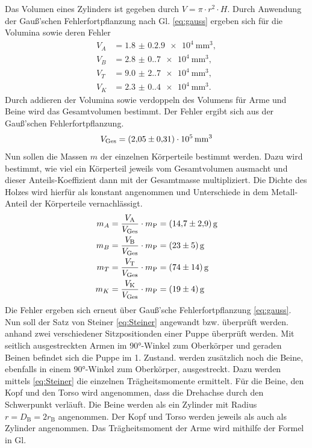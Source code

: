 Das Volumen eines Zylinders ist gegeben durch $V=\pi\cdot r^2\cdot H$. Durch Anwendung der Gauß'schen Fehlerfortpflanzung nach Gl. \eqref{eq:gauss}
ergeben sich für die Volumina sowie deren Fehler 
\begin{align*}
  V_A&=\SI{1.8(0.29)e4}{\milli\meter\cubed},\\
  V_B&=\SI{2.8(0.7)e4} {\milli\meter\cubed},\\
  V_T&=\SI{9.0(2.7)e4} {\milli\meter\cubed},\\
  V_K&=\SI{2.3(0.4)e4} {\milli\meter\cubed}.
\end{align*}
Durch addieren der Volumina sowie verdoppeln des Volumens für Arme und Beine 
wird das Gesamtvolumen bestimmt. Der Fehler ergibt sich aus der Gauß'schen Fehlerfortpflanzung.
\begin{equation*}
  V_\text{Ges}=\qty{2,05+-0,31e5}{\milli\meter\cubed}
\end{equation*}
Nun sollen die Massen $m$ der einzelnen Körperteile bestimmt werden. Dazu wird bestimmt, wie viel
ein Körperteil jeweils vom Gesamtvolumen ausmacht und dieser Anteils-Koeffizient dann mit 
der Gesamtmasse multipliziert. Die Dichte des Holzes wird hierfür als konstant angenommen und
Unterschiede in dem Metall-Anteil der Körperteile vernachlässigt.
\begin{align*}
  m_A&=\frac{V_\text{A}}{V_\text{Ges}}\cdot m_\text{P}=\qty{14.7+-2.9}{\gram}\\
  m_B&=\frac{V_\text{B}}{V_\text{Ges}}\cdot m_\text{P}=\qty{23+-5}{\gram}\\
  m_T&=\frac{V_\text{T}}{V_\text{Ges}}\cdot m_\text{P}=\qty{74+-14}{\gram}\\
  m_K&=\frac{V_\text{K}}{V_\text{Ges}}\cdot m_\text{P}=\qty{19+-4}{\gram}
\end{align*}
  Die Fehler ergeben sich erneut über Gauß'sche Fehlerfortpflanzung \eqref{eq:gauss}.
Nun soll der Satz von Steiner \eqref{eq:Steiner} angewandt bzw. überprüft werden.
anhand zwei verschiedener Sitzpositionden einer Puppe überprüft werden. Mit seitlich ausgestreckten
Armen im 90°-Winkel zum Oberkörper und geraden Beinen befindet sich die Puppe im 1. Zustand. werden 
zusätzlich noch die Beine, ebenfalls in einem 90°-Winkel zum Oberkörper, ausgestreckt.
Dazu werden mittels \eqref{eq:Steiner} die einzelnen Trägheitsmomente ermittelt.
Für die Beine, den Kopf und den Torso wird angenommen, dass die Drehachse durch den Schwerpunkt
verläuft. Die Beine werden als ein Zylinder mit Radius $r=D_\text{B}=2r_\text{B}$ angenommen. Der Kopf und Torso werden
jeweils als auch als Zylinder angenommen. Das Trägheitsmoment der Arme wird mithilfe der Formel in Gl. 
